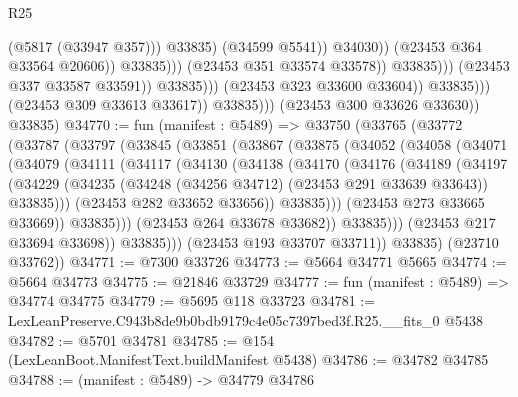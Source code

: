 \begin{lexlean}{R25}
\begin{coremodule}
                                                          (@5817 (@33947 @357)))
                                                        @33835)
                                                      (@34599 @5541))
                                                    @34030))
                                                (@23453 @364 @33564 @20606))
                                              @33835)))
                                        (@23453 @351 @33574 @33578))
                                      @33835)))
                                (@23453 @337 @33587 @33591))
                              @33835)))
                        (@23453 @323 @33600 @33604))
                      @33835)))
                (@23453 @309 @33613 @33617))
              @33835)))
        (@23453 @300 @33626 @33630))
      @33835)
@34770 := fun (manifest : @5489) =>
  @33750
    (@33765
      (@33772
        (@33787
          (@33797
            (@33845
              (@33851
                (@33867
                  (@33875
                    (@34052
                      (@34058
                        (@34071
                          (@34079
                            (@34111
                              (@34117
                                (@34130
                                  (@34138
                                    (@34170
                                      (@34176
                                        (@34189
                                          (@34197
                                            (@34229
                                              (@34235
                                                (@34248 (@34256 @34712) (@23453 @291 @33639 @33643))
                                                @33835)))
                                          (@23453 @282 @33652 @33656))
                                        @33835)))
                                  (@23453 @273 @33665 @33669))
                                @33835)))
                          (@23453 @264 @33678 @33682))
                        @33835)))
                  (@23453 @217 @33694 @33698))
                @33835)))
          (@23453 @193 @33707 @33711))
        @33835)
      (@23710 @33762))
@34771 := @7300 @33726
@34773 := @5664 @34771 @5665
@34774 := @5664 @34773
@34775 := @21846 @33729
@34777 := fun (manifest : @5489) => @34774 @34775
@34779 := @5695 @118 @33723
@34781 := LexLeanPreserve.C943b8de9b0bdb9179c4e05c7397bed3f.R25.__fits_0 @5438
@34782 := @5701 @34781
@34785 := @154 (LexLeanBoot.ManifestText.buildManifest @5438)
@34786 := @34782 @34785
@34788 := (manifest : @5489) -> @34779 @34786

\end{coremodule}
\end{lexlean}
